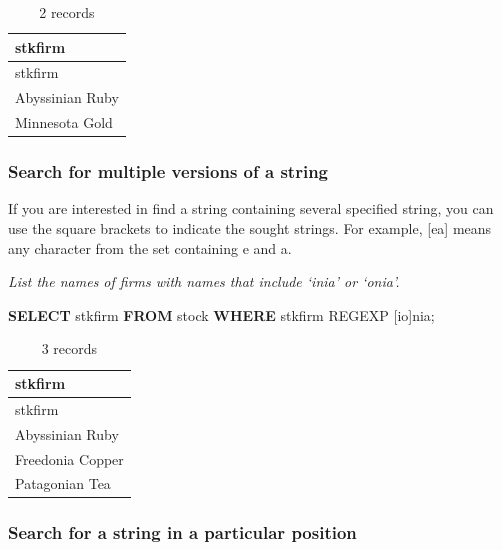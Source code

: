 \documentclass[
]{article}
\newenvironment{Shaded}{\begin{snugshade}}{\end{snugshade}}
\newcommand{\KeywordTok}[1]{\textcolor[rgb]{0.13,0.29,0.53}{\textbf{#1}}}
\newcommand{\NormalTok}[1]{#1}
\newcommand{\StringTok}[1]{\textcolor[rgb]{0.31,0.60,0.02}{#1}}
\begin{document}
\begin{longtable}[]{@{}l@{}}
\caption{2 records}\tabularnewline
\toprule()
stkfirm \\
\midrule()
\endfirsthead
\toprule()
stkfirm \\
\midrule()
\endhead
Abyssinian Ruby \\
Minnesota Gold \\
\bottomrule()
\end{longtable}

\hypertarget{search-for-multiple-versions-of-a-string}{%
\subsubsection{Search for multiple versions of a
string}\label{search-for-multiple-versions-of-a-string}}

If you are interested in find a string containing several specified
string, you can use the square brackets to indicate the sought strings.
For example, {[}ea{]} means any character from the set containing e and
a.

\emph{List the names of firms with names that include `inia' or `onia'.}

\begin{Shaded}
\begin{Highlighting}[]
\KeywordTok{SELECT}\NormalTok{ stkfirm }\KeywordTok{FROM}\NormalTok{ stock }\KeywordTok{WHERE}\NormalTok{ stkfirm REGEXP }\StringTok{\textquotesingle{}[io]nia\textquotesingle{}}\NormalTok{;}
\end{Highlighting}
\end{Shaded}

\begin{longtable}[]{@{}l@{}}
\caption{3 records}\tabularnewline
\toprule()
stkfirm \\
\midrule()
\endfirsthead
\toprule()
stkfirm \\
\midrule()
\endhead
Abyssinian Ruby \\
Freedonia Copper \\
Patagonian Tea \\
\bottomrule()
\end{longtable}

\hypertarget{search-for-a-string-in-a-particular-position}{%
\subsubsection{Search for a string in a particular
position}\label{search-for-a-string-in-a-particular-position}}
\end{document}
